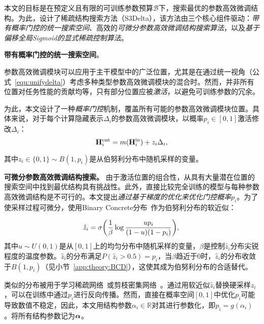 本文的目标是在预定义且有限的可训练参数预算$\mathcal{B}$下，搜索最优的参数高效微调结构。为此，设计了稀疏结构搜索方法（S3Delta），该方法由三个核心组件驱动：\emph{带有概率门控的统一搜索空间}、高效的\emph{可微分参数高效微调结构搜索算法}，以及\emph{基于偏移全局Sigmoid的显式稀疏控制算法}。


\textbf{带有概率门控的统一搜索空间}。
\label{sec:meth:searchspace}

参数高效微调模块可以应用于主干模型中的广泛位置，尤其是在通过统一视角（公式~\eqref{equ:unifydelta}）考虑多种类型参数高效微调模块的混合时。然而，并非所有位置对任务性能的贡献均等，只有部分位置应被\emph{激活}，以避免可训练参数的冗余。

为此，本文设计了一种\emph{概率门控}机制，覆盖所有可能的参数高效微调模块位置。具体来说，对于每个计算隐藏表示$\Delta_i$的参数高效微调模块，以概率$p_i\in [0,1]$激活修改$\Delta_i$：
\begin{equation}
\small
    \mathbf{H}^{\text{out}}_i = m(\mathbf{H}^{\text{in}}_i) + z_i \Delta_i,
\end{equation}

其中$z_i \in \{0,1\}\sim {B}(1,p_i)$是从伯努利分布中随机采样的变量。


\textbf{可微分参数高效微调结构搜索。} 由于激活位置的组合性，从具有大量潜在位置的搜索空间中找到最优结构具有挑战性。此外，直接比较完全训练的模型与每种参数高效微调结构是不可行的。本文提出\emph{通过基于梯度的优化来优化门控概率$p_i$}。为了使采样过程可微分，使用Binary Concrete分布~\cite{maddison2016concrete,jang2016categorical}作为伯努利分布的软近似：

\begin{equation}
\small
\label{equ:zhat}
    \hat{z}_i  = \sigma{\left(\frac{1}\beta \operatorname{log}\frac{u p_i}{(1-u)(1-p_i)}\right)}, \\
\end{equation}
其中$u\sim U(0,1)$是从$[0,1]$上的均匀分布中随机采样的变量，$\beta$是控制$\hat{z}_i$分布尖锐程度的温度参数。{$\hat{z}_i$的分布满足$P(\hat{z}_i > 0.5) = p_i$，当$\beta$趋近于$0$时，$\hat{z}_i$的分布收敛于${B}(1, p_i)$（见小节~\ref{app:theory:BCD}），这使其成为伯努利分布的合适替代。}

类似的分布被用于学习稀疏网络~\cite{louizos2017learning}或剪枝密集网络~\cite{wang2019structured}。通过用软近似$\hat{z}_i$替换硬采样$z_i$，可以在训练中通过$p_i$进行反向传播。然而，直接在概率空间$[0,1]$中优化$p_i$可能导致数值不稳定，因此，本文用结构参数$\alpha_i\in \mathbb{R}$对其进行参数化，即$p_i = g(\alpha_i)$。将所有结构参数记为$\boldsymbol{\alpha}$。


